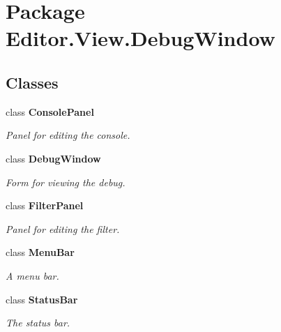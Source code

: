 \section{Package Editor.\-View.\-Debug\-Window}
\label{namespace_editor_1_1_view_1_1_debug_window}
\subsection*{Classes}
\begin{DoxyCompactItemize}
\item 
class {\bf Console\-Panel}
\begin{DoxyCompactList}\small\item\em Panel for editing the console. \end{DoxyCompactList}\item 
class {\bf Debug\-Window}
\begin{DoxyCompactList}\small\item\em Form for viewing the debug. \end{DoxyCompactList}\item 
class {\bf Filter\-Panel}
\begin{DoxyCompactList}\small\item\em Panel for editing the filter. \end{DoxyCompactList}\item 
class {\bf Menu\-Bar}
\begin{DoxyCompactList}\small\item\em A menu bar. \end{DoxyCompactList}\item 
class {\bf Status\-Bar}
\begin{DoxyCompactList}\small\item\em The status bar. \end{DoxyCompactList}\end{DoxyCompactItemize}
